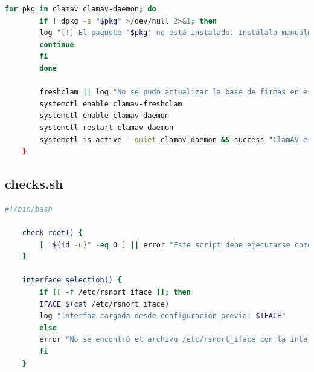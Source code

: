 \documentclass[11pt,a4paper,twoside]{report}
\begin{document}
\begin{lstlisting}[language=bash, caption={\texttt{build\_from\_source.sh}}]
		for pkg in clamav clamav-daemon; do
		if ! dpkg -s "$pkg" >/dev/null 2>&1; then
		log "[!] El paquete '$pkg' no está instalado. Instálalo manualmente con: sudo apt install clamav clamav-daemon"
		continue
		fi
		done
		
		freshclam || log "No se pudo actualizar la base de firmas en este momento"
		systemctl enable clamav-freshclam
		systemctl enable clamav-daemon
		systemctl restart clamav-daemon
		systemctl is-active --quiet clamav-daemon && success "ClamAV está activo." || log "ClamAV instalado pero no activo."
	}
\end{lstlisting}

\subsection*{checks.sh}
\begin{lstlisting}[language=bash, caption={\texttt{checks.sh}}, label={lst:checks-sh}]
	#!/bin/bash
	
	check_root() {
		[ "$(id -u)" -eq 0 ] || error "Este script debe ejecutarse como root."
	}
	
	interface_selection() {
		if [[ -f /etc/rsnort_iface ]]; then
		IFACE=$(cat /etc/rsnort_iface)
		log "Interfaz cargada desde configuración previa: $IFACE"
		else
		error "No se encontró el archivo /etc/rsnort_iface con la interfaz seleccionada."
		fi
	}
\end{lstlisting}
\end{document}
